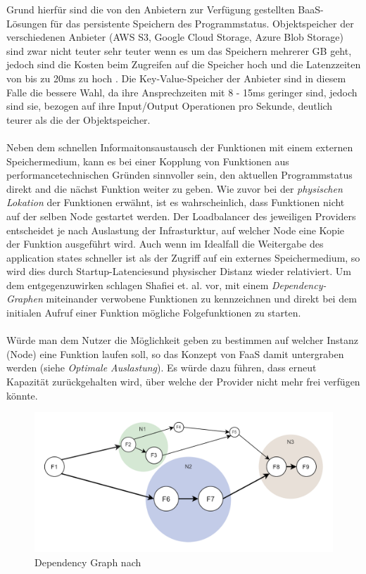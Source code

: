 \documentclass[11pt]{article}
\begin{document}
Grund hierfür sind die von den Anbietern zur Verfügung gestellten BaaS-Lösungen für das persistente Speichern des Programmstatus. Objektspeicher der verschiedenen Anbieter (AWS S3, Google Cloud Storage, Azure Blob Storage) sind zwar nicht teuter sehr teuter wenn es um das Speichern mehrerer GB geht, jedoch sind die Kosten beim Zugreifen auf die Speicher hoch und die Latenzzeiten von bis zu 20ms zu hoch \cite{jonas2019cloud}. Die Key-Value-Speicher der Anbieter sind in diesem Falle die bessere Wahl, da ihre Ansprechzeiten mit 8 - 15ms geringer sind, jedoch sind sie, bezogen auf ihre Input/Output Operationen pro Sekunde, deutlich teurer als die der Objektspeicher. \\\\
Neben dem schnellen Informaitonsaustausch der Funktionen mit einem externen Speichermedium, kann es bei einer Kopplung von Funktionen aus performancetechnischen Gründen sinnvoller sein, den aktuellen Programmstatus direkt and die nächst Funktion weiter zu geben. Wie zuvor bei der \textit{physischen Lokation} der Funktionen erwähnt, ist es wahrscheinlich, dass Funktionen nicht auf der selben Node gestartet werden. Der Loadbalancer des jeweiligen Providers entscheidet je nach Auslastung der Infrasturktur, auf welcher Node eine Kopie der Funktion ausgeführt wird. Auch wenn im Idealfall die Weitergabe des \glqq application states\grqq{} schneller ist als der Zugriff auf ein externes Speichermedium, so wird dies durch \glqq Startup-Latencies\grqq{}und physischer Distanz wieder relativiert. Um dem entgegenzuwirken schlagen Shaﬁei et. al. \cite{shafiei2020serverless} vor, mit einem \textit{Dependency-Graphen} miteinander verwobene Funktionen zu kennzeichnen und direkt bei dem initialen Aufruf einer Funktion mögliche Folgefunktionen zu starten. \\\\
Würde man dem Nutzer die Möglichkeit geben zu bestimmen auf welcher Instanz (Node) eine Funktion laufen soll, so das Konzept von FaaS damit untergraben werden (siehe \textit{Optimale Auslastung}). Es würde dazu führen, dass erneut Kapazität zurückgehalten wird, über welche der Provider nicht mehr frei verfügen könnte. 
\begin{figure}[H]
\caption{Dependency Graph nach \cite{shafiei2020serverless}}
\label{fig:dependencyGraph}
\centering
\includegraphics[width=1\textwidth]{DependencyGraph}
\end{figure} 
\end{document}
